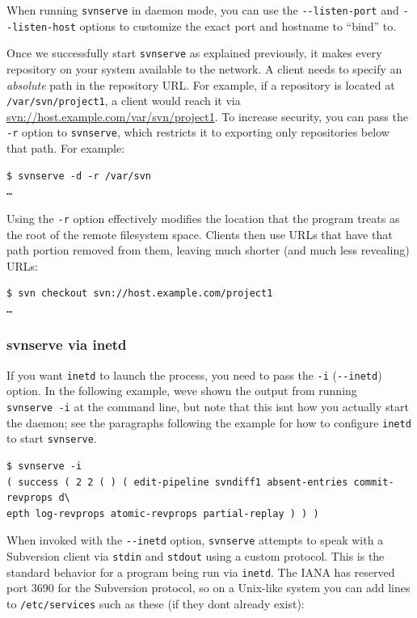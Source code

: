 When running \texttt{svnserve} in daemon mode, you can use the
\texttt{-\/-listen-port} and \texttt{-\/-listen-host} options to
customize the exact port and hostname to ``bind'' to.

Once we successfully start \texttt{svnserve} as explained previously, it
makes every repository on your system available to the network. A client
needs to specify an \emph{absolute} path in the repository URL. For
example, if a repository is located at \texttt{/var/svn/project1}, a
client would reach it via \url{svn://host.example.com/var/svn/project1}.
To increase security, you can pass the \texttt{-r} option to
\texttt{svnserve}, which restricts it to exporting only repositories
below that path. For example:

\begin{verbatim}
$ svnserve -d -r /var/svn
…
\end{verbatim}

Using the \texttt{-r} option effectively modifies the location that the
program treats as the root of the remote filesystem space. Clients then
use URLs that have that path portion removed from them, leaving much
shorter (and much less revealing) URLs:

\begin{verbatim}
$ svn checkout svn://host.example.com/project1
…
\end{verbatim}

\subsubsection{svnserve via
inetd}\label{svn.serverconfig.svnserve.invoking.inetd}

If you want \texttt{inetd} to launch the process, you need to pass the
\texttt{-i} (\texttt{-\/-inetd}) option. In the following example,
we\textquotesingle ve shown the output from running
\texttt{svnserve\ -i} at the command line, but note that this
isn\textquotesingle t how you actually start the daemon; see the
paragraphs following the example for how to configure \texttt{inetd} to
start \texttt{svnserve}.

\begin{verbatim}
$ svnserve -i
( success ( 2 2 ( ) ( edit-pipeline svndiff1 absent-entries commit-revprops d\
epth log-revprops atomic-revprops partial-replay ) ) )
\end{verbatim}

When invoked with the \texttt{-\/-inetd} option, \texttt{svnserve}
attempts to speak with a Subversion client via \texttt{stdin} and
\texttt{stdout} using a custom protocol. This is the standard behavior
for a program being run via \texttt{inetd}. The IANA has reserved port
3690 for the Subversion protocol, so on a Unix-like system you can add
lines to \texttt{/etc/services} such as these (if they
don\textquotesingle t already exist):

